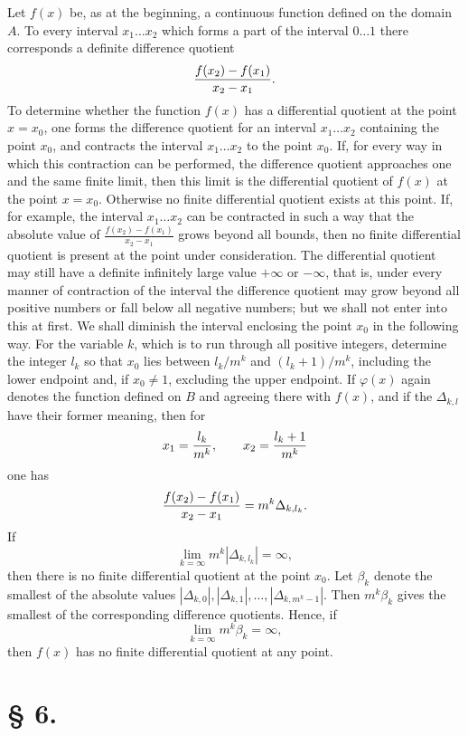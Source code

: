 \documentclass[11pt,a4paper]{article}
\begin{document}
Let $f(x)$ be, as at the beginning, a continuous function defined on the domain $A$. To every interval $x_1\ldots x_2$ which forms a part of the interval $0\ldots1$ there corresponds a definite difference quotient
\[
 {f(x_2)-f(x_1)\over x_2-x_1}.
\]
To determine whether the function $f(x)$ has a differential quotient at the point $x=x_0$, one forms the difference quotient for an interval $x_1\ldots x_2$ containing the point $x_0$, and contracts the interval $x_1\ldots x_2$ to the point $x_0$. If, for every way in which this contraction can be performed, the difference quotient approaches one and the same finite limit, then this limit is the differential quotient of $f(x)$ at the point $x=x_0$. Otherwise no finite differential quotient exists at this point. If, for example, the interval $x_1\ldots x_2$ can be contracted in such a way that the absolute value of $\frac{f(x_2)-f(x_1)}{x_2-x_1}$ grows beyond all bounds, then no finite differential quotient is present at the point under consideration. The differential quotient may still have a definite infinitely large value $+\infty$ or $-\infty$, that is, under every manner of contraction of the interval the difference quotient may grow beyond all positive numbers or fall below all negative numbers; but we shall not enter into this at first. We shall diminish the interval enclosing the point $x_0$ in the following way. For the variable $k$, which is to run through all positive integers, determine the integer $l_k$ so that $x_0$ lies between $l_k/m^k$ and $(l_k+1)/m^k$, including the lower endpoint and, if $x_0\ne1$, excluding the upper endpoint. If $\varphi(x)$ again denotes the function defined on $B$ and agreeing there with $f(x)$, and if the $\Delta_{k,l}$ have their former meaning, then for
\[
 x_1={l_k\over m^k},\qquad x_2={l_k+1\over m^k}
\]
one has
\[
 {f(x_2)-f(x_1)\over x_2-x_1}=m^k\Delta_{k,l_k}.
\]
If
\[
 \lim_{k=\infty}m^k|\Delta_{k,l_k}|=\infty,
\]
then there is no finite differential quotient at the point $x_0$. Let $\beta_k$ denote the smallest of the absolute values $|\Delta_{k,0}|,|\Delta_{k,1}|,\ldots,|\Delta_{k,m^k-1}|$. Then $m^k\beta_k$ gives the smallest of the corresponding difference quotients. Hence, if
\[
 \lim_{k=\infty}m^k\beta_k=\infty,
\]
then $f(x)$ has no finite differential quotient at any point.

\section*{§ 6.}
\end{document}
